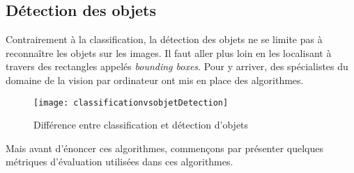     \subsection{Détection des objets}
    Contrairement à la classification, la détection des objets ne se limite pas à reconnaître les objets sur les images. Il faut aller plus loin en les localisant à travers des rectangles appelés \textit{bounding boxes}. Pour y arriver, des spécialistes du domaine de la vision par ordinateur ont mis en place des algorithmes.
        \begin{figure}[H]
            \centering
            \texttt{[image: classificationvsobjetDetection]}
            \caption{Différence entre classification et détection d'objets}
        \end{figure}
    
    Mais avant d'énoncer ces algorithmes, commençons par présenter quelques métriques d’évaluation utilisées dans ces algorithmes. 
